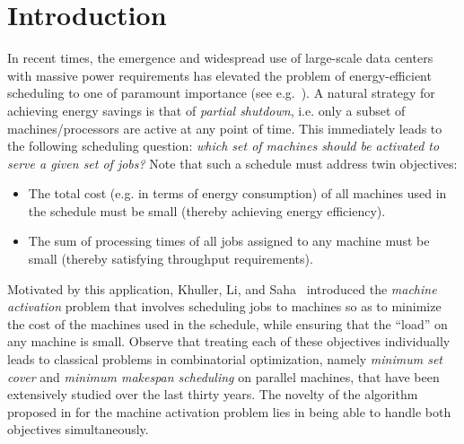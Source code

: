 \documentclass[11pt]{article}
\begin{document}
\clearpage

\setcounter{page}{1}

\section{Introduction}

In recent times, the emergence and widespread use of large-scale data centers with 
massive power requirements has elevated the problem of energy-efficient scheduling 
to one of paramount importance (see e.g.~\cite{BirmanCR09}). A natural strategy 
for achieving energy savings is that of {\em partial shutdown}, i.e. only 
a subset of machines/processors are active at any point of time. This immediately leads to 
the following scheduling question: {\em which set of machines should be activated 
to serve a given set of jobs?} Note that such a schedule must address twin
objectives:
\begin{itemize}
	\item The total cost (e.g. in terms of energy consumption) of all 
	machines used in the schedule must be small (thereby achieving energy
	efficiency).
	\item The sum of processing times of all jobs assigned to any machine
	must be small (thereby satisfying throughput requirements).
\end{itemize}
Motivated by this application, Khuller, Li, and Saha~\cite{KhullerLS10} 
introduced the {\em machine activation} problem that involves scheduling jobs 
to machines so as to minimize the cost of the machines used in the schedule, while
ensuring that the ``load'' on any machine is small.
Observe that treating each of these objectives individually leads to classical
problems in combinatorial optimization, namely {\em minimum set cover} and
{\em minimum makespan scheduling} on parallel machines, 
that have been extensively studied over
the last thirty years. The novelty of the algorithm proposed in 
\cite{KhullerLS10} for the machine activation problem lies in being able to
handle both objectives simultaneously. 
\end{document}
